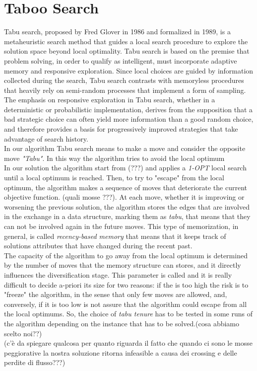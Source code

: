 \section{Taboo Search}
Tabu search, proposed by Fred Glover in 1986 and formalized in 1989, is a metaheuristic search method that guides a local search procedure to explore the solution space beyond local optimality. Tabu search is based on the premise that problem solving, in order to qualify as intelligent, must incorporate adaptive memory and responsive exploration. Since local choices are guided by information collected during the search, Tabu search contrasts with memoryless procedures that heavily rely on semi-random processes that implement a form of sampling. The emphasis on responsive exploration in Tabu search, whether in a deterministic or probabilistic implementation, derives from the supposition that a bad strategic choice can often yield more information than a good random choice, and therefore provides a basis for progressively improved strategies that take advantage of search history.\\
In our algorithm Tabu search means to make a move and consider the opposite move \textit{"Tabu"}. In this way the algorithm tries to avoid the local optimum\\
In our solution the algorithm start from (???) and applies a \textit{1-OPT} local search until a local optimum is reached. Then, to try to "escape" from the local optimum, the algorithm makes a sequence of moves that deteriorate the current objective function. (quali mosse ???). At each move, whether it is improving or worsening the previous solution, the algorithm stores the edges that are involved in the exchange in a data structure, marking them as \textit{tabu}, that means that they can not be involved again in the future moves. This type of memorization, in general, is called \textit{recency-based memory} that means that it keeps track of solutions attributes that have changed during the recent past.\\
The capacity of the algorithm to go away from the local optimum is determined by the number of moves that the memory structure can stores, and it directly influences the diversification stage. This parameter is called  and it is really difficult to decide a-priori its size for two reasons: if the  is too high the risk is to "freeze" the algorithm, in the sense that only few moves are allowed, and, conversely, if it is too low is not assure that the algorithm could escape from all
the local optimums. So, the choice of \textit{tabu tenure} has to be tested in some runs of the algorithm depending on the instance that has to be solved.(cosa abbiamo scelto noi??)\\
(c'è da spiegare qualcosa per quanto riguarda il fatto che quando ci sono le mosse peggiorative la nostra soluzione ritorna infeasible a causa dei crossing e delle perdite di flusso???)
